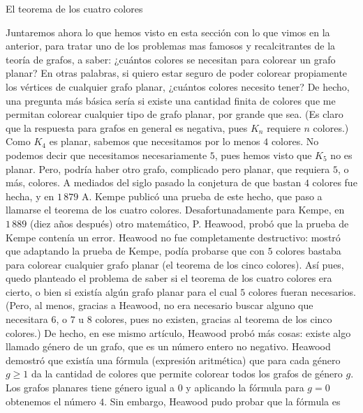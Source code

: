 \begin{section}{El teorema de los cuatro colores} \label{Ap4.3}

Juntaremos ahora lo que hemos visto en esta sección con lo que vimos en la anterior, para tratar uno de los problemas mas famosos y recalcitrantes de la teoría de grafos, a saber: ¿cuántos colores se necesitan para colorear un grafo planar? En otras palabras, si quiero estar seguro de poder colorear propiamente los vértices de cualquier grafo planar, ¿cuántos colores necesito tener? De hecho, una pregunta más básica sería si existe una cantidad finita de colores que me permitan colorear cualquier tipo de grafo planar, por grande que sea. (Es claro que la respuesta para grafos en general es negativa, pues $K_n$ requiere $n$ colores.) Como $K_4$ es planar, sabemos que necesitamos por lo menos $4$ colores. No podemos decir que necesitamos necesariamente $5$, pues hemos visto que $K_5$ no es planar. Pero, podría haber otro grafo, complicado pero planar, que requiera $5$, o más, colores. A mediados del siglo pasado la conjetura de que bastan $4$ colores fue hecha, y en $1\,879$ A. Kempe publicó una prueba de este hecho, que paso a llamarse el teorema de los cuatro colores. Desafortunadamente para Kempe, en $1\,889$ (diez años después) otro matemático, P. Heawood, probó que la prueba de Kempe contenía un error. Heawood no fue completamente destructivo: mostró que adaptando la prueba de Kempe, podía probarse que con $5$ colores bastaba para colorear cualquier grafo planar (el teorema de los cinco colores). Así pues, quedo planteado el problema de saber si el teorema de los cuatro colores era cierto, o bien si existía algún grafo planar para el cual $5$ colores fueran necesarios. (Pero, al menos, gracias a Heawood, no era necesario buscar alguno que necesitara $6$, o $7$ u $8$ colores, pues no existen, gracias al teorema de los cinco colores.) De hecho, en ese mismo artículo, Heawood probó más cosas: existe algo llamado género de un grafo, que es un número entero no negativo. Heawood demostró que existía
una  fórmula (expresión aritmética) que para cada género $g\ge 1$ da la cantidad de colores que permite colorear todos los grafos de género $g$. Los grafos planares tiene género igual a $0$ y aplicando la fórmula para $g=0$ obtenemos el número $4$. Sin embargo, Heawood pudo probar que la fórmula es

\end{section}
